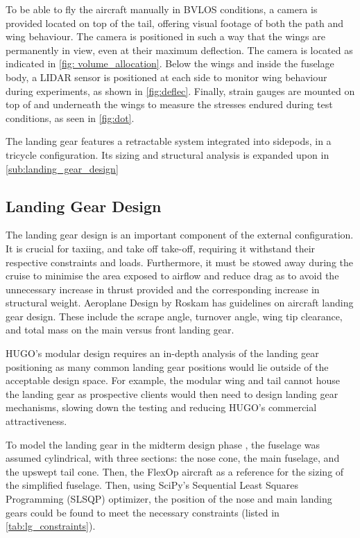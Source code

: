 To be able to fly the aircraft manually in BVLOS conditions, a camera is provided located on top of the tail, offering visual footage of both the path and wing behaviour. The camera is positioned in such a way that the wings are permanently in view, even at their maximum deflection. The camera is located as indicated in \autoref{fig: volume_allocation}. Below the wings and inside the fuselage body, a LIDAR sensor is positioned at each side to monitor wing behaviour during experiments, as shown in \autoref{fig:deflec}. Finally, strain gauges are mounted on top of and underneath the wings to measure the stresses endured during test conditions, as seen in \autoref{fig:dot}. 

The landing gear features a retractable system integrated into sidepods, in a tricycle configuration. Its sizing and structural analysis is expanded upon in \autoref{sub:landing_gear_design}

\subsection{Landing Gear Design}
\label{sub:landing_gear_design}

The landing gear design is an important component of the external configuration. It is crucial for taxiing, and take off take-off, requiring it withstand their respective constraints and loads. Furthermore, it must be stowed away during the cruise to minimise the area exposed to airflow and reduce drag as to avoid the unnecessary increase in thrust provided and the corresponding increase in structural weight. Aeroplane Design by Roskam \cite{roskamIV} has guidelines on aircraft landing gear design. These include the scrape angle, turnover angle, wing tip clearance, and total mass on the main versus front landing gear.

HUGO's modular design requires an in-depth analysis of the landing gear positioning as many common landing gear positions would lie outside of the acceptable design space. For example, the modular wing and tail cannot house the landing gear as prospective clients would then need to design landing gear mechanisms, slowing down the testing and reducing HUGO's commercial attractiveness. 

To model the landing gear in the midterm design phase , the fuselage was assumed cylindrical, with three sections: the nose cone, the main fuselage, and the upswept tail cone. %
Then, the FlexOp aircraft as a reference for the sizing of the simplified fuselage. Then, using SciPy's Sequential Least Squares Programming (SLSQP) optimizer, the position of the nose and main landing gears could be found to meet the necessary constraints (listed in \autoref{tab:lg_constraints}). 


